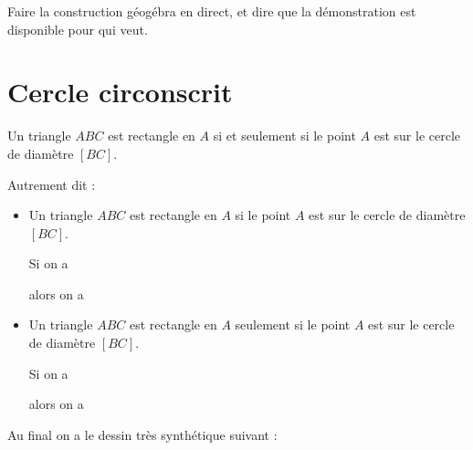 



\vspace{2cm}

Faire la construction géogébra en direct, et dire que la démonstration est disponible pour qui veut.



\section{Cercle circonscrit}

\begin{propriete}
    Un triangle \( ABC\) est rectangle en \( A\) si et seulement si le point \( A\) est sur le cercle de diamètre \( [BC]\).
\end{propriete}
Autrement dit :
\begin{itemize}
    \item
        Un triangle \( ABC\) est rectangle en \( A\) si le point \( A\) est sur le cercle de diamètre \( [BC]\).

        Si on a
 
 alors on a 
         

    \item
        Un triangle \( ABC\) est rectangle en \( A\) seulement si le point \( A\) est sur le cercle de diamètre \( [BC]\).

        Si on a
 
 alors on a 
         

\end{itemize}

Au final on a le dessin très synthétique suivant :
\begin{center}
   
\end{center}


